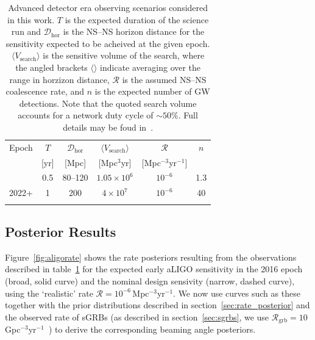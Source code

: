 \documentclass[twocolumn,nofootinbib]{revtex4-1}
\newcommand{\grbrate}{{{\mathcal R}_{\mathrm{grb}}}}
\newcommand{\cbcrate}{{{\mathcal R}}}
\newcommand{\dhor}{{\mathcal D}_{\mathrm{hor}}}
\newcommand{\BNS}{\ac{NS}--\ac{NS}\xspace}
\begin{document}
%
\begin{table}
\centering
\begin{tabular}{l c c c c c }
\toprule
Epoch & $T$ & $\dhor$ &
$\langle V_{\mathrm{search}}\rangle$ & $\cbcrate$ & $n$ \\
 & [yr] & [Mpc] & [Mpc$^3$yr] &  [Mpc$^{-3}$yr$^{-1}$] \\
\colrule
2016 & 0.5 & 80--120 & $1.05\times10^6$ & $10^{-6}$ & 1.3 \\
2022+ & 1 & 200 & $4\times10^7$ & $10^{-6}$ & 40 \\
\botrule
\end{tabular}
\caption{Advanced detector era observing scenarios considered in this work.
    $T$ is the expected duration of the science run and $\dhor$ is the \BNS horizon distance for the sensitivity expected to be acheived at the given epoch.
$\langle V_{\mathrm{search}}\rangle $ is the sensitive volume of the search, where the angled brackets $\langle \rangle$ indicate averaging over the range in horzizon distance, $\cbcrate$ is the assumed \BNS coalescence rate, and $n$ is the expected number of \ac{GW} detections.
    Note that the quoted search volume accounts for a network duty cycle of $\sim 50\%$.
    Full details may be foud in~\cite{ade_prospects}.
    \label{table:scenarios}}
\end{table}
%

\subsection{Posterior Results}
Figure~\ref{fig:aligorate} shows the rate posteriors resulting from the observations described in table~\ref{table:scenarios} for the expected early aLIGO sensitivity in the 2016 epoch (broad, solid curve) and the nominal design sensivity (narrow, dashed curve), using the `realistic' rate $\cbcrate=10^{-6}$\,Mpc$^{-3}$yr$^{-1}$.
We now use curves such as these together with the prior distributions described in section~\ref{sec:rate_posterior} and the observed rate of \acp{sGRB} (as described in section~\ref{sec:sgrbs}, we use $\grbrate=10$\,Gpc$^{-3}$yr$^{-1}$~\cite{nakar-2007,Dietz11}) to derive the corresponding beaming angle posteriors.
\end{document}
